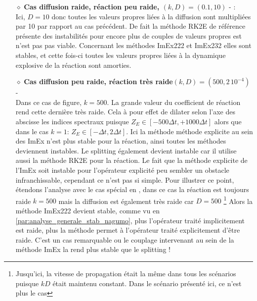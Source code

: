 \begin{itemize}
                \item[$\diamond$]\textbf{Cas diffusion raide, réaction peu raide, $(k,D)=(0.1,10)$}  - :\\
                    Ici, $D=10$ donc toutes les valeurs propres liées à la diffusion sont multipliées par 10 par rapport au cas précédent. 
                    De fait la méthode RK2E de référence présente des instabilités pour encore plus de couples de valeurs propres est n'est pas pas viable.
                    Concernant les méthodes ImEx222 et ImEx232 elles sont stables, et cette fois-ci toutes les valeurs propres liées à la 
                    dynamique explosive de la réaction sont amorties. 
                \item[$\diamond$]\textbf{Cas diffusion peu raide, réaction très raide$(k,D)=(500,2\, 10^{-4})$} - \\
                    Dans ce cas de figure, $k=500$. La grande valeur du coefficient de réaction rend cette dernière très raide. 
                    Cela à pour effet de dilater selon l'axe des abscisse les indices spectraux puisque $Z_E \in [- 500 \Delta t, + 1000 \Delta t]$
                    alors que dans le cas $k=1$: $Z_E \in [- \Delta t , 2\Delta t]$.
                    Ici la méthode méthode explicite au sein des ImEx n'est plus stable pour la réaction, ainsi toutes les méthodes deviennent instables. 
                    Le splitting également devient instable car il utilise aussi la méthode RK2E pour la réaction. 
                    Le fait que la méthode explicite de l'ImEx soit instable pour l'opérateur explicité peu sembler un obstacle infranchissable,
                    cependant ce n'est pas si simple.
                    Pour illustrer ce point, étendons l'analyse avec le cas spécial en , dans ce cas la réaction est toujours raide $k=500$ mais la diffusion est également très raide car $D=500$
                    \footnote{Jusqu'ici, la vitesse de propagation était la même dans tous les scénarios puisque $kD$ était maintenu constant. Dans le scénario présenté ici, ce n'est plus le cas}
                    Alors la méthode ImEx222 devient stable, comme vu en \ref{par:analyse_generale_stab_nagumo}, plus l'opérateur traité implicitement est raide, 
                    plus la méthode permet à l'opérateur traité explicitement d'être raide. C'est un cas remarquable ou le couplage intervenant au sein de la méthode ImEx
                    la rend plus stable que le splitting !
            \end{itemize}

